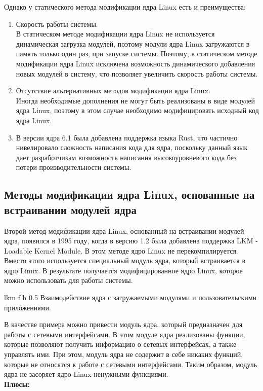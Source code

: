 Однако у статического метода модификации ядра Linux есть и преимущества:

\begin{enumerate}
    \item Скорость работы системы. \vspace{1mm}\\
    В статическом методе модификации ядра Linux не используется динамическая загрузка модулей, поэтому модули ядра Linux загружаются в память только один раз, при запуске системы.
    Поэтому, в статическом методе модификации ядра Linux исключена возможность динамического добавления новых модулей в систему, что позволяет увеличить скорость работы системы.
    \item Отсутствие альтернативных методов модификации ядра Linux.\vspace{1mm}\\
    Иногда необходимые дополнения не могут быть реализованы в виде модулей ядра Linux, поэтому в этом случае необходимо модифицировать исходный код ядра Linux.
    \item В версии ядра 6.1 была добавлена поддержка языка Rust, что частично нивелировало сложность написания кода для ядра, поскольку данный язык дает разработчикам возможность написания высокоуровневого кода без потери производительности системы.
\end{enumerate}

\subsection{Методы модификации ядра Linux, основанные на встраивании модулей ядра}\label{subsec:---linux-----}

Второй метод модификации ядра Linux, основанный на встраивании модулей ядра, появился в 1995 году, когда в версию 1.2 была добавлена поддержка LKM - Loadable Kernel Module.
В этом методе ядро Linux не перекомпилируется.
Вместо этого используется специальный модуль ядра, который встраивается в ядро Linux.
В результате получается модифицированное ядро Linux, которое можно использовать для работы системы.

{lkm} %
{f}
{h}
{0.5\textwidth} %
{Взаимодействие ядра с загружаемыми модулями и пользовательскими приложениями.} %

В качестве примера можно привести модуль ядра, который предназначен для работы с сетевыми интерфейсами.
В этом модуле ядра реализованы функции, которые позволяют получить информацию о сетевых интерфейсах, а также управлять ими.
При этом, модуль ядра не содержит в себе никаких функций, которые не относятся к работе с сетевыми интерфейсами.
Таким образом, модуль ядра не засоряет ядро Linux ненужными функциями.
\vspace{1mm}\\
\textbf{Плюсы:}

